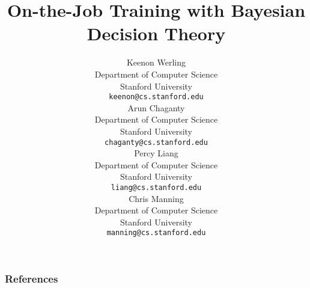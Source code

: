 \documentclass{article} %
\title{On-the-Job Training with Bayesian Decision Theory}
\author{%
Keenon Werling\\
Department of Computer Science\\
Stanford University\\
\texttt{keenon@cs.stanford.edu} \\
\And
Arun Chaganty\\
Department of Computer Science\\
Stanford University\\
\texttt{chaganty@cs.stanford.edu} \\
\And
Percy Liang\\
Department of Computer Science\\
Stanford University\\
\texttt{liang@cs.stanford.edu} \\
\And
Chris Manning\\
Department of Computer Science\\
Stanford University\\
\texttt{manning@cs.stanford.edu} \\
}
\begin{document}
\usetikzlibrary{positioning}

\maketitle



%
%



%

%
%




%

\subsubsection*{References}



\end{document}
